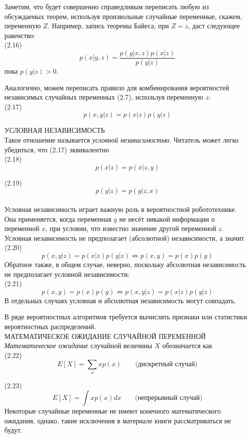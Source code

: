 \documentclass[10pt,a4paper]{article}
\begin{document}
 Заметим, что будет совершенно справедливым переписать любую из обсуждаемых теорем, используя произвольные случайные переменные, скажем, переменную $ Z $. Например,  запись теоремы Байеса, при $Z = z$, даст следующее равенство:\\

 (2.16)$$p(x | y, z) = \frac{p(y | x, z) p(x | z)}{p(y | z)}$$
 пока  $p(y | z) > 0$.
 
 Аналогично, можем переписать правило для комбинирования вероятностей независимых случайных переменных (2.7), используя переменную $z$:\\
 
 (2.17) $$p(x, y | z) = p(x | z) p(y | z)$$
 
 УСЛОВНАЯ НЕЗАВИСИМОСТЬ\\
 Такое отношение называется \textit{условной независимостью}. Читатель может легко убедиться, что (2.17) эквивалентно\\

 (2.18) $$p(x | z) = p(x | z, y)$$
 
 (2.19) $$p(y | z) = p(y | z, x)$$\\
 Условная независимость играет важную роль в вероятностной робототехнике. Она применяется, когда переменная $y$ не несёт никакой информации о переменной $x$, при условии, что известно значение другой переменной $z$. Условная независимость не предполагает (абсолютной) независимости, а значит\\
 
 (2.20) $$p(x, y | z) = p(x | z) p(y | z) \nRightarrow p(x, y) = p(x) p(y)$$
 Обратное также, в общем случае, неверно, поскольку абсолютная независимость не предполагает условной независимости:\\
 
 (2.21) $$p(x, y) = p(x) p(y) \nRightarrow p(x, y | z) = p(x | z) p(y | z)$$
 В отдельных случаях условная и абсолютная независимость могут совпадать.
  
 В ряде вероятностных алгоритмов требуется вычислять признаки или статистики вероятностных распределений.\\ 
 МАТЕМАТИЧЕСКОЕ ОЖИДАНИЕ СЛУЧАЙНОЙ ПЕРЕМЕННОЙ\\
  \textit{Математическое ожидание} случайной величины $X$ обозначается как\\
 
 (2.22) $$E[X] =\sum_{x}x p(x)\qquad\mbox {(дискретный случай)}$$
  
 (2.23) $$E[X] = \int x p(x) dx\qquad\mbox {(непрерывный случай)}$$ 
 Некоторые случайные переменные не имеют конечного математического ожидания, однако, такие исключения в материале книги рассматриваться не будут.
 
\end{document}
